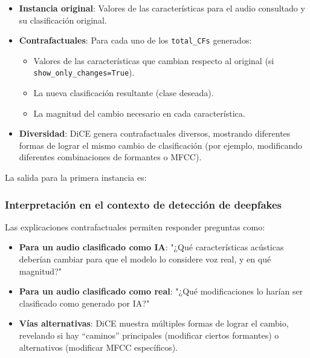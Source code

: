 \begin{itemize}
    \item \textbf{Instancia original}: Valores de las características para el audio consultado y su clasificación original.
    
    \item \textbf{Contrafactuales}: Para cada uno de los \texttt{total\_CFs} generados:
    \begin{itemize}
        \item Valores de las características que cambian respecto al original (si \texttt{show\_only\_changes=True}).
        \item La nueva clasificación resultante (clase deseada).
        \item La magnitud del cambio necesario en cada característica.
    \end{itemize}
    
    \item \textbf{Diversidad}: DiCE genera contrafactuales diversos, mostrando diferentes formas de lograr el mismo cambio de clasificación (por ejemplo, modificando diferentes combinaciones de formantes o MFCC).
\end{itemize}

La salida para la primera instancia es:

\subsubsection*{Interpretación en el contexto de detección de deepfakes}

Las explicaciones contrafactuales permiten responder preguntas como:

\begin{itemize}
    \item \textbf{Para un audio clasificado como IA}: "¿Qué características acústicas deberían cambiar para que el modelo lo considere voz real, y en qué magnitud?"
    
    \item \textbf{Para un audio clasificado como real}: "¿Qué modificaciones lo harían ser clasificado como generado por IA?"
    
    \item \textbf{Vías alternativas}: DiCE muestra múltiples formas de lograr el cambio, revelando si hay ``caminos'' principales (modificar ciertos formantes) o alternativos (modificar MFCC específicos).
\end{itemize}

